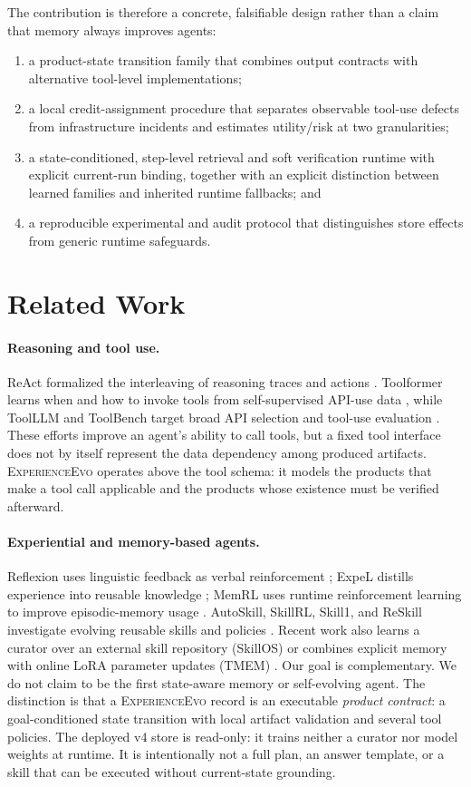 \documentclass[10pt]{article}
\newcommand{\method}{\textsc{ExperienceEvo}}
\begin{document}
The contribution is therefore a concrete, falsifiable design rather than a claim that memory always improves agents:
\begin{enumerate}
\item a product-state transition family that combines output contracts with alternative tool-level implementations;
\item a local credit-assignment procedure that separates observable tool-use defects from infrastructure incidents and estimates utility/risk at two granularities;
\item a state-conditioned, step-level retrieval and soft verification runtime with explicit current-run binding, together with an explicit distinction between learned families and inherited runtime fallbacks; and
\item a reproducible experimental and audit protocol that distinguishes store effects from generic runtime safeguards.
\end{enumerate}

\section{Related Work}
\paragraph{Reasoning and tool use.} ReAct formalized the interleaving of reasoning traces and actions \cite{react}. Toolformer learns when and how to invoke tools from self-supervised API-use data \cite{toolformer}, while ToolLLM and ToolBench target broad API selection and tool-use evaluation \cite{toolllm}. These efforts improve an agent's ability to call tools, but a fixed tool interface does not by itself represent the data dependency among produced artifacts. \method{} operates above the tool schema: it models the products that make a tool call applicable and the products whose existence must be verified afterward.

\paragraph{Experiential and memory-based agents.} Reflexion uses linguistic feedback as verbal reinforcement \cite{reflexion}; ExpeL distills experience into reusable knowledge \cite{expel}; MemRL uses runtime reinforcement learning to improve episodic-memory usage \cite{memrl}. AutoSkill, SkillRL, Skill1, and ReSkill investigate evolving reusable skills and policies \cite{autoskill,skillrl,skill1,reskill}. Recent work also learns a curator over an external skill repository (SkillOS) \cite{skillos} or combines explicit memory with online LoRA parameter updates (TMEM) \cite{tmem}. Our goal is complementary. We do not claim to be the first state-aware memory or self-evolving agent. The distinction is that a \method{} record is an executable \emph{product contract}: a goal-conditioned state transition with local artifact validation and several tool policies. The deployed v4 store is read-only: it trains neither a curator nor model weights at runtime. It is intentionally not a full plan, an answer template, or a skill that can be executed without current-state grounding.
\end{document}
